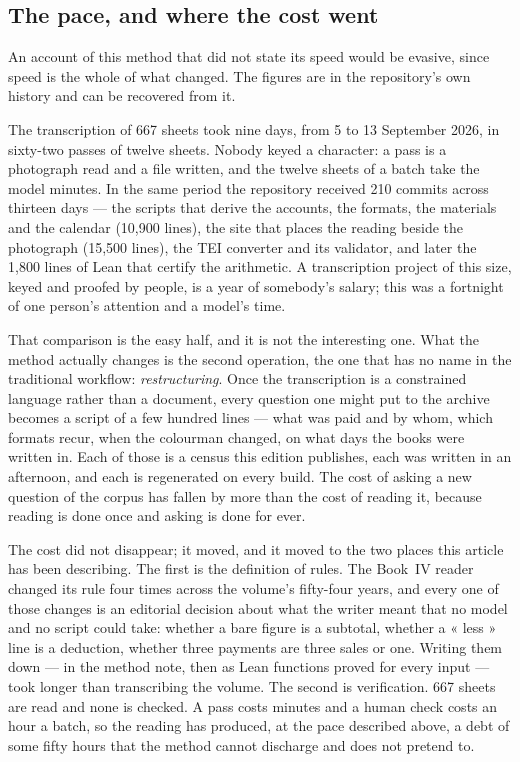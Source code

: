 \subsection{The pace, and where the cost went}

An account of this method that did not state its speed would be evasive, since
speed is the whole of what changed. The figures are in the repository's own
history and can be recovered from it.

The transcription of 667 sheets took nine days, from 5 to 13 September 2026, in
sixty-two passes of twelve sheets. Nobody keyed a character: a pass is a
photograph read and a file written, and the twelve sheets of a batch take the
model minutes. In the same period the repository received 210 commits across
thirteen days --- the scripts that derive the accounts, the formats, the
materials and the calendar (10,900 lines), the site that places the reading
beside the photograph (15,500 lines), the TEI converter and its validator, and
later the 1,800 lines of Lean that certify the arithmetic. A transcription
project of this size, keyed and proofed by people, is a year of somebody's
salary; this was a fortnight of one person's attention and a model's time.

That comparison is the easy half, and it is not the interesting one. What the
method actually changes is the second operation, the one that has no name in
the traditional workflow: \emph{restructuring}. Once the transcription is a
constrained language rather than a document, every question one might put to
the archive becomes a script of a few hundred lines --- what was paid and by
whom, which formats recur, when the colourman changed, on what days the books
were written in. Each of those is a census this edition publishes, each was
written in an afternoon, and each is regenerated on every build. The cost of
asking a new question of the corpus has fallen by more than the cost of reading
it, because reading is done once and asking is done for ever.

The cost did not disappear; it moved, and it moved to the two places this
article has been describing. The first is the definition of rules. The Book~IV
reader changed its rule four times across the volume's fifty-four years, and
every one of those changes is an editorial decision about what the writer meant
that no model and no script could take: whether a bare figure is a subtotal,
whether a « less » line is a deduction, whether three payments are three sales
or one. Writing them down --- in the method note, then as Lean functions proved
for every input --- took longer than transcribing the volume. The second is
verification. 667 sheets are read and none is checked. A pass costs minutes and
a human check costs an hour a batch, so the reading has produced, at the pace
described above, a debt of some fifty hours that the method cannot discharge
and does not pretend to.

